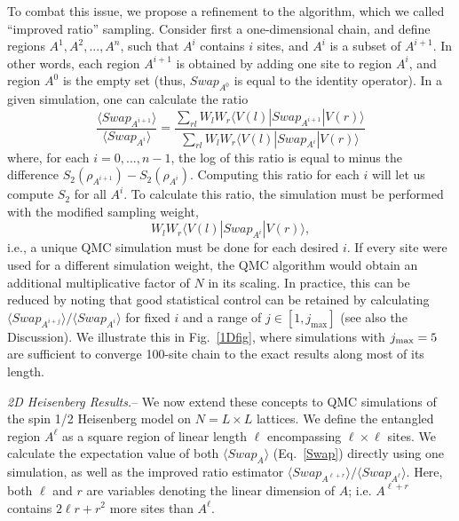 \documentclass[prl,aps,twocolumn,floatfix,amsmath,amssymb,superscriptaddress,tightenlines]{revtex4}
\begin{document}
To combat this issue, we propose a refinement to the algorithm, which we called ``improved ratio'' sampling.
Consider first a one-dimensional chain, and define regions $A^1,A^2,...,A^n$, such
that $A^i$ contains $i$ sites, and $A^i$ is a subset of $A^{i+1}$.  In other words, each region $A^{i+1}$ is obtained by adding one site to region
$A^{i}$, and region $A^0$ is the empty set (thus, $Swap_{A^0}$ is equal to the identity operator).
In a given simulation, one can calculate the ratio
\begin{equation}
\frac{\langle Swap_{A^{i+1}}\rangle}{\langle Swap_{A^{i}}\rangle}
= \frac{\sum_{rl} W_l W_r \langle V(l) | Swap_{A^{i+1}} | V(r) \rangle} {\sum_{rl} W_l W_r \langle V(l) | Swap_{A^i} | V(r) \rangle}
\label{Ratio}
\end{equation}
where, for each $i=0,...,n-1$, the log of this ratio is equal to minus the difference $S_2(\rho_{A^{i+1}})-S_2(\rho_{A^{i}})$.
Computing this ratio for each $i$ will let us compute $S_2$ for all $A^i$.  To calculate this ratio, the simulation must be performed 
with the modified sampling weight,
\begin{equation}
W_l W_r \langle V(l) | Swap_{A^i} | V(r) \rangle,
\end{equation}
i.e., a unique QMC simulation must be done for each desired $i$.  %
If every site were used for a different simulation weight, the QMC algorithm would obtain an additional multiplicative factor of $N$ in its scaling.
In practice, 
this can be reduced by noting that good statistical control can be retained by calculating 
${\langle Swap_{A^{i+j}}\rangle}/{\langle Swap_{A^{i}}\rangle}$ for fixed $i$ and a range of $j \in [1,j_{\max}]$ (see also the Discussion).  We illustrate this in Fig.~\ref{1Dfig},
where simulations with $j_{\rm max}=5$ are sufficient to converge 100-site chain to the exact results along most of its length.

{\it 2D Heisenberg Results.}-- We now extend these concepts to QMC simulations of the spin 1/2 Heisenberg model on $N=L \times L$ lattices.  We define the entangled region $A^\ell$ as a square region of linear length $\ell$ encompassing $\ell \times \ell$ sites.  We calculate the expectation value of both $\langle Swap_A \rangle$ (Eq.~\ref{Swap}) directly using one simulation, as well as the improved ratio estimator ${\langle Swap_{A^{\ell+r}}\rangle}/{\langle Swap_{A^{\ell}}\rangle}$.  Here, both $\ell$ and $r$ are variables denoting the linear dimension of $A$; i.e. $A^{\ell+r}$ contains $2\ell r+r^2$ more sites than $A^{\ell}$.
\end{document}
